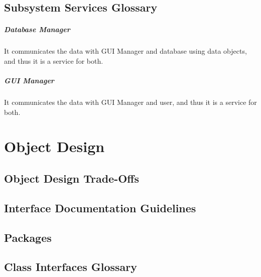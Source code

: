 \documentclass[a4paper,12pt]{report}
\begin{document}
		\section{Subsystem Services Glossary}
			\paragraph{Database Manager} It communicates the data with GUI Manager and database using data objects, and thus it is a service for both.
			\paragraph{GUI Manager} It communicates the data with GUI Manager and user, and thus it is a service for both.
	\chapter{Object Design}
		\section{Object Design Trade-Offs}
		\section{Interface Documentation Guidelines}
		\section{Packages}
		\section{Class Interfaces Glossary}
\end{document}
